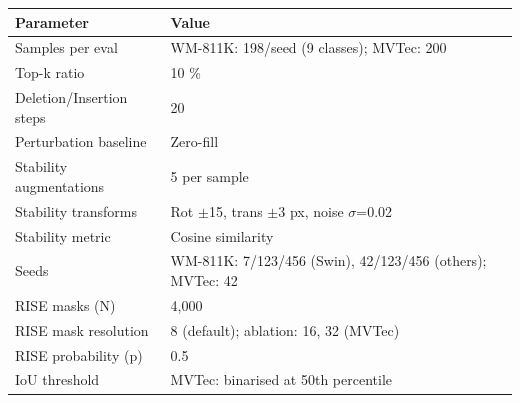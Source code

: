 \documentclass[11pt,a4paper]{article}
\begin{document}
\begin{tabular}{ll}
\toprule
Parameter & Value \\
\midrule
Samples per eval & WM-811K: 198/seed (9 classes); MVTec: 200 \\
Top-k ratio & 10 \% \\
Deletion/Insertion steps & 20 \\
Perturbation baseline & Zero-fill \\
Stability augmentations & 5 per sample \\
Stability transforms & Rot $\pm$15\textdegree{}, trans $\pm$3 px, noise $\sigma$=0.02 \\
Stability metric & Cosine similarity \\
Seeds & WM-811K: 7/123/456 (Swin), 42/123/456 (others); MVTec: 42 \\
RISE masks (N) & 4,000 \\
RISE mask resolution & 8 (default); ablation: 16, 32 (MVTec) \\
RISE probability (p) & 0.5 \\
IoU threshold & MVTec: binarised at 50th percentile \\
\bottomrule
\end{tabular}



\begin{table}[htbp]
\centering
\small
\caption{\textbf{Supplementary Table S3.} Per-seed classification results for all twelve WM-811K paper runs}
\end{table}
\end{document}
